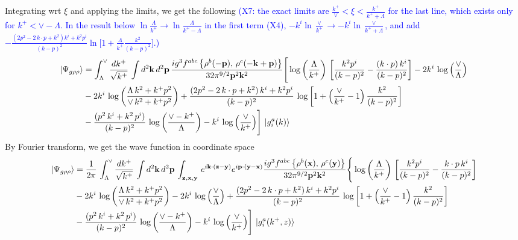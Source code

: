 \documentclass[aps,prd,amsmath,amssymb,nofootinbib]{revtex4-2}
\def\v#1{\mathbf{#1}}
\numberwithin{equation}{section}
\begin{document}
Integrating wrt $\xi$ and applying the limits, we get the following \textcolor{blue}{(X7: the exact limits are $\frac{k^+}{\vee}<\xi<\frac{k^+}{k^++\Lambda}$ for the last line, which exists only for $k^+<\vee-\Lambda$. In the result below $\ln\frac{\Lambda}{k^+}\to\ln\frac{\Lambda}{k^+-\Lambda}$ in the first term (X4), $-k^{i}\ln\frac{\vee}{k^+}\to-k^{i}\ln\frac{\vee}{k^++\Lambda}$, and add $-\frac{(2p^{2}-2\,k\cdot p+k^{2})k^{i}+k^{2}p^{i}}{(k-p)^{2}}\ln\big[1+\frac{\Lambda}{k^+}\frac{k^{2}}{(k-p)^{2}}\big]$.)}
\begin{align}
    \left|\Psi_{g\rho\rho}\right\rangle & =  \int_{\Lambda}^{\vee}\frac{dk^{+}}{\sqrt{k^{+}}}\,\int d^{2}\mathbf{k}\, d^{2}\mathbf{p}\,\frac{ig^{3}f^{abc}\left\{ \rho^{b}(-\mathbf{p}),\,\rho^{c}(-\mathbf{k}+\mathbf{p})\right\}}{32\pi^{9/2}\mathbf{p}^{2}\mathbf{k}^{2}}\Bigg[\log{\left(\frac{\Lambda}{k^{+}}\right)}\,\left[\frac{k^{2}p^{i}}{(k-p)^{2}}-\frac{(k\cdot p)\,k^{i}}{(k-p)^{2}}\right]-2k^{i}\,\log{\left(\frac{\vee}{\Lambda}\right)}\notag \\ & -2k^{i}\,\log{\left(\frac{\Lambda\,k^{2} + k^{+}p^{2}}{\vee\, k^{2}+k^{+}p^{2}}\right)}+\frac{(2p^{2}-2\,k\cdot p + k^{2})\,k^{i} + k^{2}p^{i}}{(k-p)^{2}}\, \log{\left[1+\left(\frac{\vee}{k^{+}}-1\right)\frac{k^{2}}{(k-p)^{2}}\right]}\notag \\ & - \frac{(p^{2}\,k^{i}+k^{2}\,p^{i})}{(k-p)^{2}}\, \log{\left(\frac{\vee - k^{+}}{\Lambda}\right)}-k^{i}\, \log{\left(\frac{\vee}{k^{+}}\right)}\Bigg]\, \ket{g^{a}_{i}(k)}
\end{align}
By Fourier transform, we get the wave function in coordinate space
\begin{align}
    \left|\Psi_{g\rho\rho}\right\rangle & =  \frac{1}{2\pi}\,\int_{\Lambda}^{\vee}\frac{dk^{+}}{\sqrt{k^{+}}}\,\int d^{2}\mathbf{k}\, d^{2}\mathbf{p}\,\int_{\v{z},\v{x},\v{y}}\, e^{i\v{k}\cdot (\v{z}-\v{y})} e^{i\v{p}\cdot (\v{y}-\v{x})}\frac{ig^{3}f^{abc}\left\{ \rho^{b}(\mathbf{x}),\,\rho^{c}(\mathbf{y})\right\}}{32\pi^{9/2}\mathbf{p}^{2}\mathbf{k}^{2}}\Bigg\{\log{\left(\frac{\Lambda}{k^{+}}\right)}\,\left[\frac{k^{2}p^{i}}{(k-p)^{2}}-\frac{k\cdot p\,k^{i}}{(k-p)^{2}}\right]\notag \\ & -2k^{i}\,\log{\left(\frac{\Lambda\,k^{2} + k^{+}p^{2}}{\vee\, k^{2}+k^{+}p^{2}}\right)}-2k^{i}\,\log{\left(\frac{\vee}{\Lambda}\right)}+\frac{(2p^{2}-2\,k\cdot p + k^{2})\,k^{i} + k^{2}p^{i}}{(k-p)^{2}}\, \log{\left[1+\left(\frac{\vee}{k^{+}}-1\right)\frac{k^{2}}{(k-p)^{2}}\right]}\notag \\ & - \frac{(p^{2}\,k^{i}+k^{2}\,p^{i})}{(k-p)^{2}}\, \log{\left(\frac{\vee - k^{+}}{\Lambda}\right)}-k^{i}\, \log{\left(\frac{\vee}{k^{+}}\right)}\Bigg]\, \ket{g^{a}_{i}(k^{+},z)}
\end{align}
\end{document}
